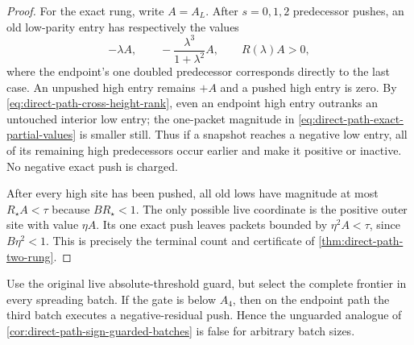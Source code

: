 \begin{proof}
For the exact rung, write $A=A_L$.  After $s=0,1,2$ predecessor pushes, an
old low-parity entry has respectively the values
\begin{equation}
 -\lambda A,
 \qquad
 -\frac{\lambda^3}{1+\lambda^2}A,
 \qquad
 R(\lambda)A>0,
 \label{eq:direct-path-exact-partial-values}
\end{equation}
where the endpoint's one doubled predecessor corresponds directly to the
last case.  An unpushed high entry remains $+A$ and a pushed high entry is
zero.  By \cref{eq:direct-path-cross-height-rank}, even an endpoint high
entry outranks an untouched interior low entry; the one-packet magnitude in
\cref{eq:direct-path-exact-partial-values} is smaller still.  Thus if a
snapshot reaches a negative low entry, all of its remaining high
predecessors occur earlier and make it positive or inactive.  No negative
exact push is charged.

After every high site has been pushed, all old lows have magnitude at most
$R_\star A<\tau$ because $BR_\star<1$.  The only possible live coordinate
is the positive outer site with value $\eta A$.  Its one exact push leaves
packets bounded by $\eta^2A<\tau$, since $B\eta^2<1$.  This is precisely the
terminal count and certificate of \cref{thm:direct-path-two-rung}.
\end{proof}

\begin{proposition}
\label{prop:direct-path-full-batch-fails}
Use the original live absolute-threshold guard, but select the complete
frontier in every spreading batch.  If the gate is below $A_4$, then on the
endpoint path the third batch executes a negative-residual push.  Hence the
unguarded analogue of
\cref{cor:direct-path-sign-guarded-batches} is false for arbitrary batch
sizes.
\end{proposition}

